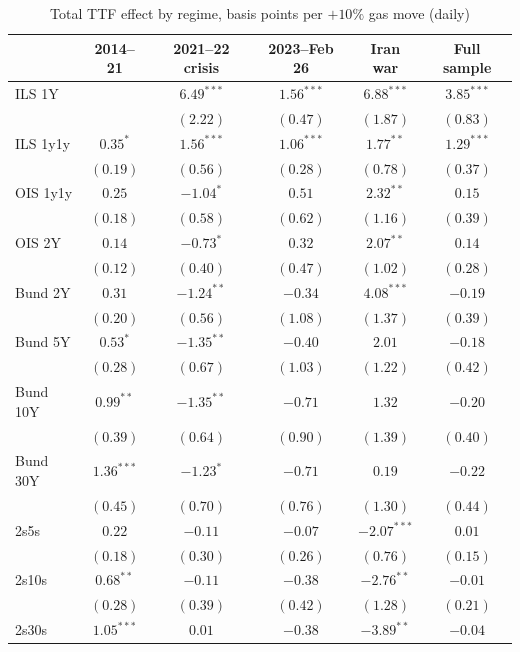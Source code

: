 \documentclass[11pt,a4paper]{article}
\begin{document}
\begin{table}[htbp]\centering\footnotesize
\caption{Total TTF effect by regime, basis points per $+10\%$ gas move (daily)}\label{tab:regimes}
\setlength{\tabcolsep}{5pt}
\begin{tabular}{@{}l*{5}{c}@{}}
\toprule
 & 2014--21 & 2021--22 crisis & 2023--Feb 26 & Iran war & Full sample\\\midrule
ILS 1Y &  & $6.49^{***}$ & $1.56^{***}$ & $6.88^{***}$ & $3.85^{***}$\\
 &  & $(2.22)$ & $(0.47)$ & $(1.87)$ & $(0.83)$\\
ILS 1y1y & $0.35^{*}$ & $1.56^{***}$ & $1.06^{***}$ & $1.77^{**}$ & $1.29^{***}$\\
 & $(0.19)$ & $(0.56)$ & $(0.28)$ & $(0.78)$ & $(0.37)$\\
OIS 1y1y & $0.25$ & $-1.04^{*}$ & $0.51$ & $2.32^{**}$ & $0.15$\\
 & $(0.18)$ & $(0.58)$ & $(0.62)$ & $(1.16)$ & $(0.39)$\\
OIS 2Y & $0.14$ & $-0.73^{*}$ & $0.32$ & $2.07^{**}$ & $0.14$\\
 & $(0.12)$ & $(0.40)$ & $(0.47)$ & $(1.02)$ & $(0.28)$\\
\addlinespace[3pt]
Bund 2Y & $0.31$ & $-1.24^{**}$ & $-0.34$ & $4.08^{***}$ & $-0.19$\\
 & $(0.20)$ & $(0.56)$ & $(1.08)$ & $(1.37)$ & $(0.39)$\\
Bund 5Y & $0.53^{*}$ & $-1.35^{**}$ & $-0.40$ & $2.01$ & $-0.18$\\
 & $(0.28)$ & $(0.67)$ & $(1.03)$ & $(1.22)$ & $(0.42)$\\
Bund 10Y & $0.99^{**}$ & $-1.35^{**}$ & $-0.71$ & $1.32$ & $-0.20$\\
 & $(0.39)$ & $(0.64)$ & $(0.90)$ & $(1.39)$ & $(0.40)$\\
Bund 30Y & $1.36^{***}$ & $-1.23^{*}$ & $-0.71$ & $0.19$ & $-0.22$\\
 & $(0.45)$ & $(0.70)$ & $(0.76)$ & $(1.30)$ & $(0.44)$\\
\addlinespace[3pt]
2s5s & $0.22$ & $-0.11$ & $-0.07$ & $-2.07^{***}$ & $0.01$\\
 & $(0.18)$ & $(0.30)$ & $(0.26)$ & $(0.76)$ & $(0.15)$\\
2s10s & $0.68^{**}$ & $-0.11$ & $-0.38$ & $-2.76^{**}$ & $-0.01$\\
 & $(0.28)$ & $(0.39)$ & $(0.42)$ & $(1.28)$ & $(0.21)$\\
2s30s & $1.05^{***}$ & $0.01$ & $-0.38$ & $-3.89^{**}$ & $-0.04$\\

\end{tabular}
\end{table}
\end{document}
